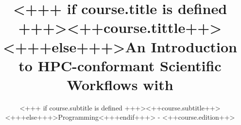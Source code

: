 \documentclass[english,xcolor=pdftex,dvipsnames]{beamer}
\title[<++course.shorttitle++>]{<+++ if course.title is defined +++><++course.tittle++><+++else+++>An Introduction to HPC-conformant Scientific Workflows with \Snakemake<+++endif+++>}
\subtitle{<+++ if course.subtitle is defined +++><++course.subtitle++><+++else+++>Programming<+++endif+++> - <++course.edition++>}
\begin{document}

\begin{frame}[plain] %
  \titlepage
\end{frame}














           

       

       


    




      

%
\end{document}

